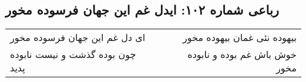\begin{center}
\section*{رباعی شماره ۱۰۲: ایدل غم این جهان فرسوده مخور}
\label{sec:sh102}
\begin{longtable}{l p{0.5cm} r}
ای دل غم این جهان فرسوده مخور
&&
بیهوده نئی غمان بیهوده مخور
\\
چون بوده گذشت و نیست نابوده پدید
&&
خوش باش غم بوده و نابوده مخور
\\
\end{longtable}
\end{center}
